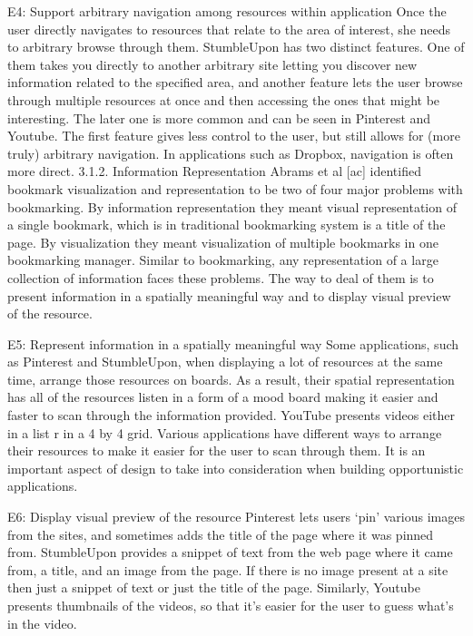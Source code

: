 \documentclass{casconpaper}
\begin{document}
{E4: Support arbitrary navigation among resources within application
Once the user directly navigates to resources that relate to the area of interest, she needs to arbitrary browse through them. StumbleUpon has two distinct features. One of them takes you directly to another arbitrary site letting you discover new information related to the specified area, and another feature lets the user browse through multiple resources at once and then accessing the ones that might be interesting. The later one is more common and  can be seen in Pinterest and Youtube. The first feature gives less control to the user, but still allows for (more truly) arbitrary navigation. In applications such as Dropbox, navigation is often more direct. 
3.1.2. Information Representation
Abrams et al [ac] identified bookmark visualization and representation to be two of four major problems with bookmarking. By information representation they meant visual representation of a single bookmark, which is in traditional bookmarking system is a title of the page. By visualization they meant visualization of multiple bookmarks in one bookmarking manager. Similar to bookmarking, any representation of a large collection of information faces these problems. The way to deal of them is to present information in a spatially meaningful way and to display visual preview of the resource.   

E5: Represent information in a spatially meaningful way
Some applications, such as Pinterest and StumbleUpon, when displaying a lot of resources at the same time, arrange those resources on boards. As a result, their spatial representation has all of the resources listen in a form of a mood board making it easier and faster to scan through the information provided. YouTube presents videos either in a list r in a 4 by 4 grid. Various applications have different ways to arrange their resources to make it easier for the user to scan through them. It is an important aspect of design to take into consideration when building opportunistic applications.  

E6: Display visual preview of the resource
Pinterest lets users ‘pin’ various images from the sites, and sometimes adds the title of the page where it was pinned from. StumbleUpon provides a snippet of text from the web page where it came from, a title, and an image from the page. If there is no image present at a site then just a snippet of text or just the title of the page. Similarly, Youtube presents thumbnails of the videos, so that it’s easier for the user to guess what’s in the video.

} %
\end{document}
